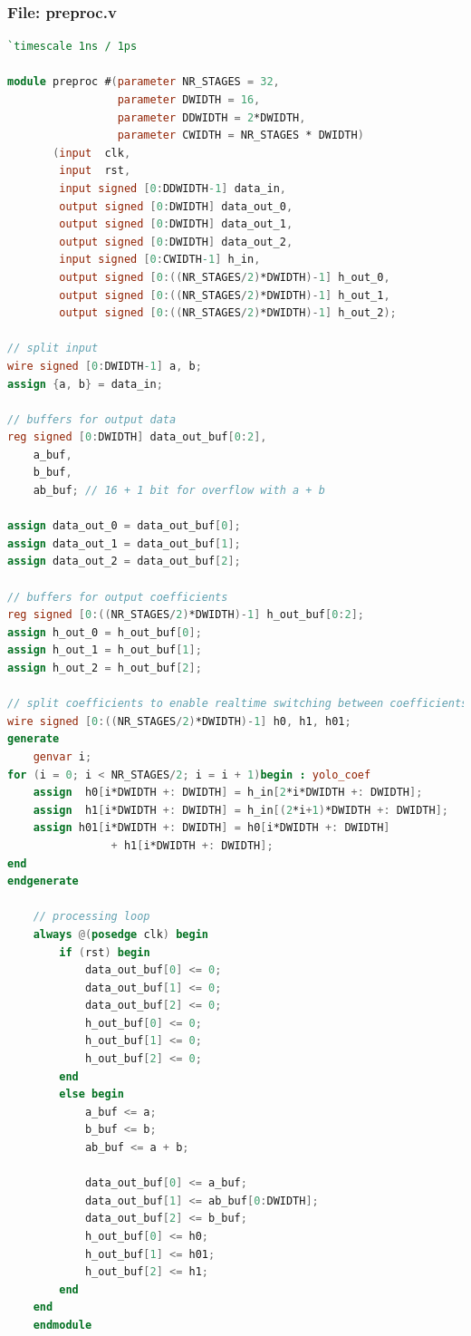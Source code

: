 \documentclass[a4paper,twoside,11pt, fleqn]{article}
\begin{document}
\subsubsection{File: preproc.v}
\begin{lstlisting}[language=Verilog]
`timescale 1ns / 1ps

module preproc #(parameter NR_STAGES = 32,
                 parameter DWIDTH = 16,
                 parameter DDWIDTH = 2*DWIDTH,
                 parameter CWIDTH = NR_STAGES * DWIDTH)
       (input  clk,
        input  rst,
        input signed [0:DDWIDTH-1] data_in,
        output signed [0:DWIDTH] data_out_0,
        output signed [0:DWIDTH] data_out_1,
        output signed [0:DWIDTH] data_out_2,
        input signed [0:CWIDTH-1] h_in,
        output signed [0:((NR_STAGES/2)*DWIDTH)-1] h_out_0,
        output signed [0:((NR_STAGES/2)*DWIDTH)-1] h_out_1,
        output signed [0:((NR_STAGES/2)*DWIDTH)-1] h_out_2);

// split input
wire signed [0:DWIDTH-1] a, b;
assign {a, b} = data_in;

// buffers for output data
reg signed [0:DWIDTH] data_out_buf[0:2],
    a_buf,
    b_buf,
    ab_buf; // 16 + 1 bit for overflow with a + b

assign data_out_0 = data_out_buf[0];
assign data_out_1 = data_out_buf[1];
assign data_out_2 = data_out_buf[2];

// buffers for output coefficients
reg signed [0:((NR_STAGES/2)*DWIDTH)-1] h_out_buf[0:2];
assign h_out_0 = h_out_buf[0];
assign h_out_1 = h_out_buf[1];
assign h_out_2 = h_out_buf[2];

// split coefficients to enable realtime switching between coefficients
wire signed [0:((NR_STAGES/2)*DWIDTH)-1] h0, h1, h01;
generate
    genvar i;
for (i = 0; i < NR_STAGES/2; i = i + 1)begin : yolo_coef
    assign  h0[i*DWIDTH +: DWIDTH] = h_in[2*i*DWIDTH +: DWIDTH];
    assign  h1[i*DWIDTH +: DWIDTH] = h_in[(2*i+1)*DWIDTH +: DWIDTH];
    assign h01[i*DWIDTH +: DWIDTH] = h0[i*DWIDTH +: DWIDTH] 
    			+ h1[i*DWIDTH +: DWIDTH];
end
endgenerate

    // processing loop
    always @(posedge clk) begin
        if (rst) begin
            data_out_buf[0] <= 0;
            data_out_buf[1] <= 0;
            data_out_buf[2] <= 0;
            h_out_buf[0] <= 0;
            h_out_buf[1] <= 0;
            h_out_buf[2] <= 0;
        end
        else begin
            a_buf <= a;
            b_buf <= b;
            ab_buf <= a + b;

            data_out_buf[0] <= a_buf;
            data_out_buf[1] <= ab_buf[0:DWIDTH];
            data_out_buf[2] <= b_buf;
            h_out_buf[0] <= h0;
            h_out_buf[1] <= h01;
            h_out_buf[2] <= h1;
        end
    end
    endmodule
\end{lstlisting}
\end{document}
